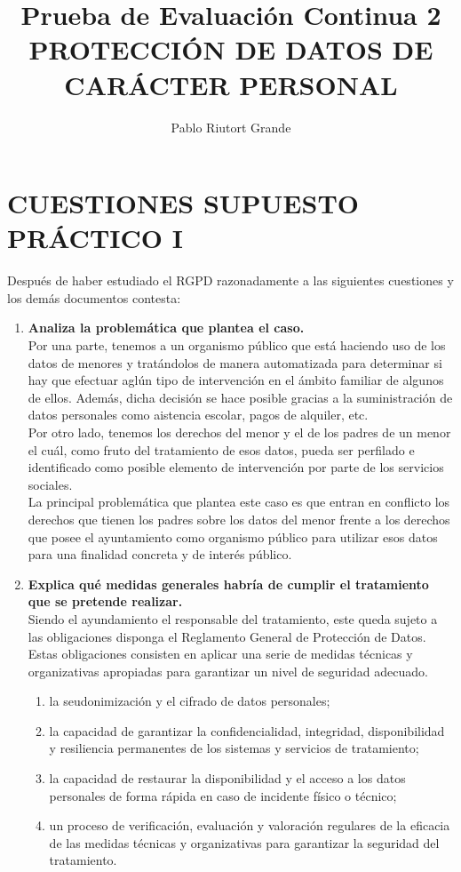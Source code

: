 \documentclass[10pt,a4paper]{article}
\author{Pablo Riutort Grande}
\title{Prueba de Evaluación Continua 2\\ \vspace{1cm}\textbf{PROTECCIÓN DE DATOS DE CARÁCTER PERSONAL}}
\begin{document}
\maketitle
\pagebreak
\section{CUESTIONES SUPUESTO PRÁCTICO I}
Después de haber estudiado el RGPD razonadamente a las siguientes cuestiones y los demás documentos contesta:
\begin{enumerate}
\item \textbf{Analiza la problemática que plantea el caso.}\\
Por una parte, tenemos a un organismo público que está haciendo uso de los datos de menores y tratándolos de manera automatizada para determinar si hay que efectuar aglún tipo de intervención en el ámbito familiar de algunos de ellos. Además, dicha decisión se hace posible gracias a la suministración de datos personales como aistencia escolar, pagos de alquiler, etc.\\
Por otro lado, tenemos los derechos del menor y el de los padres de un menor el cuál, como fruto del tratamiento de esos datos, pueda ser perfilado e identificado como posible elemento de intervención por parte de los servicios sociales.\\

La principal problemática que plantea este caso es que entran en conflicto los derechos que tienen los padres sobre los datos del menor frente a los derechos que posee el ayuntamiento como organismo público para utilizar esos datos para una finalidad concreta y de interés público.

\item \textbf{Explica qué medidas generales habría de cumplir el tratamiento que se pretende realizar.}\\
Siendo el ayundamiento el responsable del tratamiento, este queda sujeto a las obligaciones disponga el Reglamento General de Protección de Datos. Estas obligaciones consisten en aplicar una serie de medidas técnicas y organizativas apropiadas para garantizar un nivel de seguridad adecuado. \cite[Sec 2. art 32.]{RGPD}
\begin{enumerate}[label=(\alph*)]
\item la seudonimización y el cifrado de datos personales;
\item  la capacidad de garantizar la confidencialidad, integridad, disponibilidad y resiliencia permanentes de los sistemas y servicios de tratamiento;
\item  la capacidad de restaurar la disponibilidad y el acceso a los datos personales de forma rápida en caso de incidente físico o técnico;
\item  un proceso de verificación, evaluación y valoración regulares de la eficacia de las medidas técnicas y organizativas para garantizar la seguridad del tratamiento. 
\end{enumerate}


\end{enumerate}
\end{document}
